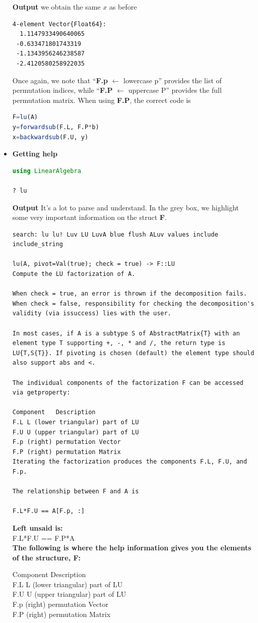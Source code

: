 \begin{itemize}
\textbf{Output} we obtain the same $x$ as before
\begin{verbatim}
4-element Vector{Float64}:
  1.1147933490640065
 -0.633471801743319
 -1.1343956246238587
 -2.4120580258922035
 \end{verbatim}
 \begin{tcolorbox}
  Once again, we note that ``\textbf{F.p} $\leftarrow$ lowercase p'' provides the list of permutation indices, while  ``\textbf{F.P} $\leftarrow$ uppercase P'' provides the full permutation matrix. When using \textbf{F.P}, the correct code is
\begin{lstlisting}[language=Julia,style=mystyle]
F=lu(A)
y=forwardsub(F.L, F.P*b)
x=backwardsub(F.U, y)
\end{lstlisting}
 \end{tcolorbox}
 \item \textbf{Getting help}
\begin{lstlisting}[language=Julia,style=mystyle]
using LinearAlgebra    

? lu
\end{lstlisting}
\textbf{Output} It's a lot to parse and understand. In the grey box, we highlight some very important information on the struct \textbf{F}.\\

\begin{verbatim}
search: lu lu! Luv LU LuvA blue flush ALuv values include include_string

lu(A, pivot=Val(true); check = true) -> F::LU
Compute the LU factorization of A.

When check = true, an error is thrown if the decomposition fails. When check = false, responsibility for checking the decomposition's validity (via issuccess) lies with the user.

In most cases, if A is a subtype S of AbstractMatrix{T} with an element type T supporting +, -, * and /, the return type is LU{T,S{T}}. If pivoting is chosen (default) the element type should also support abs and <.

The individual components of the factorization F can be accessed via getproperty:

Component	Description
F.L	L (lower triangular) part of LU
F.U	U (upper triangular) part of LU
F.p	(right) permutation Vector
F.P	(right) permutation Matrix
Iterating the factorization produces the components F.L, F.U, and F.p.

The relationship between F and A is

F.L*F.U == A[F.p, :]
\end{verbatim}
\textbf{Left unsaid is:} \\
F.L*F.U == F.P*A\\
\textbf{The following is where the help information gives you the elements of the structure, F:}
\begin{tcolorbox}
Component	Description\\
F.L	L (lower triangular) part of LU\\
F.U	U (upper triangular) part of LU\\
F.p	(right) permutation Vector\\
F.P	(right) permutation Matrix\\


\end{tcolorbox}
\end{itemize}

